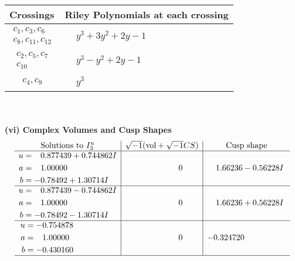 \documentclass[1p]{elsarticle_modified}
\theoremstyle{definition}
\newcommand{\I}{\sqrt{-1}}
\begin{document}
\begin{tabular}{m{50pt}|m{274pt}}
Crossings & \hspace{64pt}Riley Polynomials at each crossing \\
\hline $$\begin{aligned}c_{1},c_{3},c_{6}\\c_{8},c_{11},c_{12}\end{aligned}$$&$\begin{aligned}
&y^3+3 y^2+2 y-1
\end{aligned}$\\
\hline $$\begin{aligned}c_{2},c_{5},c_{7}\\c_{10}\end{aligned}$$&$\begin{aligned}
&y^3- y^2+2 y-1
\end{aligned}$\\
\hline $$\begin{aligned}c_{4},c_{9}\end{aligned}$$&$\begin{aligned}
&y^3
\end{aligned}$\\
\hline
\end{tabular}\\~\\
\newpage\flushleft \textbf{(vi) Complex Volumes and Cusp Shapes}
$$\begin{array}{c|c|c}  
\text{Solutions to }I^u_{3}& \I (\text{vol} + \sqrt{-1}CS) & \text{Cusp shape}\\
 \hline 
\begin{aligned}
u &= \phantom{-}0.877439 + 0.744862 I \\
a &= \phantom{-}1.00000\phantom{ +0.000000I} \\
b &= -0.78492 + 1.30714 I\end{aligned}
 & \phantom{-0.000000 } 0 & \phantom{-}1.66236 - 0.56228 I \\ \hline\begin{aligned}
u &= \phantom{-}0.877439 - 0.744862 I \\
a &= \phantom{-}1.00000\phantom{ +0.000000I} \\
b &= -0.78492 - 1.30714 I\end{aligned}
 & \phantom{-0.000000 } 0 & \phantom{-}1.66236 + 0.56228 I \\ \hline\begin{aligned}
u &= -0.754878\phantom{ +0.000000I} \\
a &= \phantom{-}1.00000\phantom{ +0.000000I} \\
b &= -0.430160\phantom{ +0.000000I}\end{aligned}
 & \phantom{-0.000000 } 0 & -0.324720\phantom{ +0.000000I}\\
 \hline 
 \end{array}$$\newpage
\end{document}
